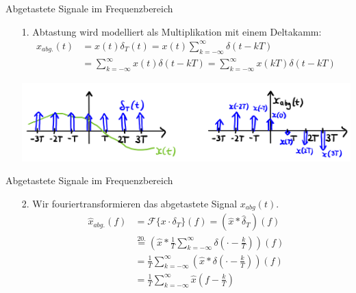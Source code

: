 \documentclass[14pt, aspectratio=169, handout]{beamer}
\begin{document}
\begin{frame}{Abgetastete Signale im Frequenzbereich}
    \begin{enumerate}
    \item[1.] Abtastung wird modelliert als Multiplikation mit einem Deltakamm:
    \vspace*{-0.5cm}
    \begin{align*}
        x_{abg.}(t) &= x(t)\delta_T(t) = x(t)\sum_{k=-\infty}^{\infty} \delta(t-kT) \\
        &= \sum_{k=-\infty}^{\infty}x(t)\delta(t-kT) = \sum_{k=-\infty}^{\infty} x(kT)\delta(t-kT)
    \end{align*}
    \vspace*{-0.5cm}
    \item[] \begin{center}
        \includegraphics[width=0.8\linewidth]{figures/abtastung1.jpg}
    \end{center}
    \end{enumerate}
\end{frame}

\begin{frame}{Abgetastete Signale im Frequenzbereich}
    \begin{enumerate}
        \item[2.] Wir fouriertransformieren das abgetastete Signal $x_{abg}(t)$.
    \begin{align*}
        \hat{x}_{abg.}(f) &= \mathcal{F}\{x \cdot \delta_T\}(f) = \left( \hat{x} \ast \hat{\delta}_T \right)(f) \\
        &\overset{20.}{=} \left( \hat{x} \ast \frac{1}{T} \sum_{k=-\infty}^\infty \delta\left(\cdot - \frac{k}{T}\right) \right)(f) \\
        &= \frac{1}{T} \sum_{k=-\infty}^\infty \left( \hat{x} \ast \delta \left( \cdot - \frac{k}{T} \right) \right)(f) \\
        &= \frac{1}{T} \sum_{k = -\infty}^\infty \hat{x}\left( f- \frac{k}{T} \right)
    \end{align*}
    \end{enumerate}
\end{frame}
\end{document}
